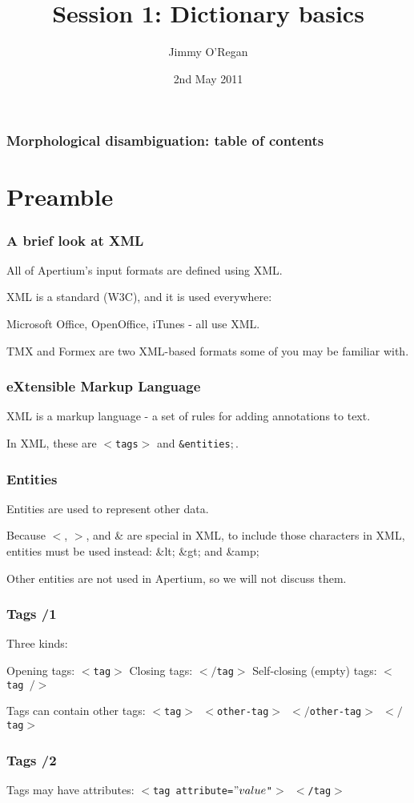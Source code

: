 \documentclass{beamer} %
\date{2nd May 2011}
\title{Session 1: Dictionary basics}
\author{Jimmy O'Regan}
\newcommand{\MyLogoBottomCentred}{
\begin{textblock}{14}(53.5,70)
  \pgfuseimage{logo}
\end{textblock}
}
\begin{document}
\frame{\titlepage \MyLogoBottomCentred}


\begin{frame}
  \frametitle{Morphological disambiguation: table of contents}
  \tableofcontents
\end{frame}


\section{Preamble}

\begin{frame}
  \frametitle{A brief look at XML}
  All of Apertium's input formats are defined using XML.

  XML is a standard (W3C), and it is used everywhere:

  Microsoft Office, OpenOffice, iTunes - all use XML.

  TMX and Formex are two XML-based formats some of you may be familiar with.
\end{frame}

\begin{frame}
  \frametitle{eXtensible Markup Language}

  XML is a markup language - a set of rules for adding annotations to text.

  In XML, these are {\tt $<$tags$>$} and {\tt \&entities$;$}.

\end{frame}

\begin{frame}
  \frametitle{Entities}

  Entities are used to represent other data.

  Because $<$, $>$, and \& are special in XML, to include those characters in XML, entities must be used instead: \&lt; \&gt; and \&amp;

  Other entities are not used in Apertium, so we will not discuss them.

\end{frame}

\begin{frame}
  \frametitle{Tags /1}
  Three kinds:

  Opening tags: {\tt $<$tag$>$}
  Closing tags: {\tt $</$tag$>$}
  Self-closing (empty) tags: {\tt $<$tag $/>$}

  Tags can contain other tags: {\tt $<$tag$>$ $<$other-tag$>$ $</$other-tag$>$ $</$tag$>$}
\end{frame}

\begin{frame}
  \frametitle{Tags /2}

  Tags may have attributes: {\tt $<$tag attribute=$"value$"$>$ $<$/tag$>$}

\end{frame}
\end{document}
